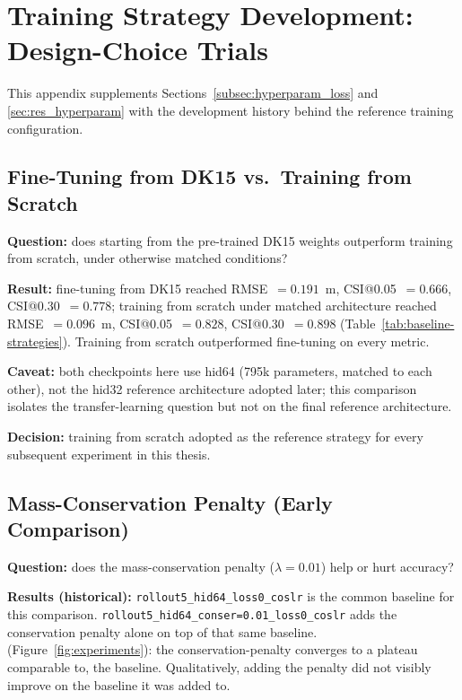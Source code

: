 \documentclass[12pt,a4paper]{report}
\begin{document}
{\chapter{Training Strategy Development: Design-Choice Trials}
\label{app:training_dev}

This appendix supplements Sections~\ref{subsec:hyperparam_loss} and
\ref{sec:res_hyperparam} with the development history behind the
reference training configuration.

\section{Fine-Tuning from DK15 vs.\ Training from Scratch}
\label{app:finetune_vs_scratch}

\textbf{Question:} does starting from the pre-trained DK15 weights outperform
training from scratch, under otherwise matched conditions?

\textbf{Result:} fine-tuning from DK15 reached RMSE~$=0.191$~m, CSI@0.05~$=0.666$,
CSI@0.30~$=0.778$; training from scratch under matched architecture reached
RMSE~$=0.096$~m, CSI@0.05~$=0.828$, CSI@0.30~$=0.898$
(Table~\ref{tab:baseline-strategies}). Training from scratch outperformed
fine-tuning on every metric.

\textbf{Caveat:} both checkpoints here use hid64 (795k parameters, matched to
each other), not the hid32 reference architecture adopted later; this comparison isolates the transfer-learning
question but not on the final reference architecture.

\textbf{Decision:} training from scratch adopted as the reference strategy for
every subsequent experiment in this thesis.

\section{Mass-Conservation Penalty (Early Comparison)}
\label{app:conservation_early}

\textbf{Question:} does the mass-conservation penalty ($\lambda=0.01$) help or hurt accuracy?

\textbf{Results (historical):} \texttt{rollout5\_hid64\_loss0\_coslr}
is the common baseline for this comparison. \texttt{rollout5\_hid64\_conser=0.01\_loss0\_coslr} adds
the conservation penalty alone on top of that same baseline.
(Figure~\ref{fig:experiments}): the conservation-penalty converges to a plateau comparable to,
the baseline. Qualitatively,
adding the penalty did not visibly improve on the baseline it was added to.

}
\end{document}
